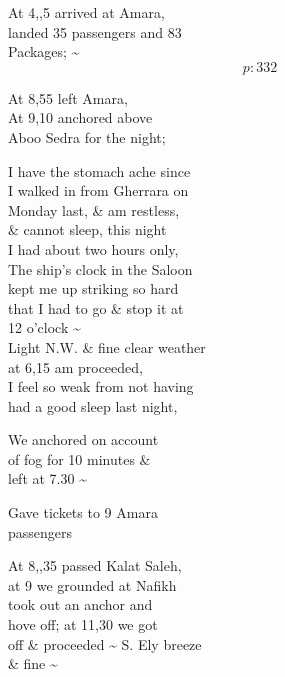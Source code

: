 \documentclass{report}
\begin{document}
	\par{
 	At 4,,5 arrived at Amara,\ \\landed 35 passengers and 83\ \\Packages; \~{}\ \\
  \[p: 332 \]

	}

	\par{
 	At 8,55 left Amara,\ \\At 9,10 anchored above\ \\Aboo Sedra for the night;\ \\
	}

	\par{
 	I have the stomach ache since\ \\I walked in from Gherrara on\ \\Monday last, \& am restless,\ \\\& cannot sleep, this night\ \\I had about two hours only,\ \\The ship’s clock in the Saloon\ \\kept me up striking so hard\ \\that I had to go \& stop it at\ \\12 o'clock \~{}\ \\Light N.W. \& fine clear weather\ \\at 6,15 am proceeded,\ \\I feel so weak from not having\ \\had a good sleep last night,\ \\
	}

	\par{
 	We anchored on account\ \\of fog for 10 minutes \&\ \\left at 7.30 \~{}\ \\
	}

	\par{
 	Gave tickets to 9 Amara\ \\passengers\ \\
	}

	\par{
 	At 8,,35 passed Kalat Saleh,\ \\at 9 we grounded at Nafikh\ \\took out an anchor and\ \\hove off; at 11,30 we got\ \\off \& proceeded \~{} S. Ely breeze\ \\\& fine \~{}\ \\
	}
\end{document}
